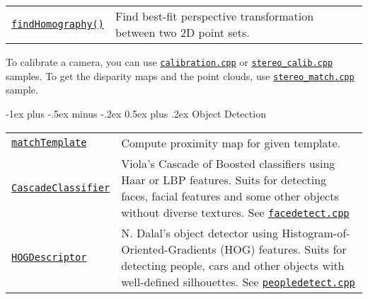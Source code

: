 \documentclass[10pt,landscape]{article}
\makeatletter
\renewcommand{\section}{\@startsection{section}{1}{0mm}%
                                {-1ex plus -.5ex minus -.2ex}%
                                {0.5ex plus .2ex}%
                                {\normalfont\large\bfseries}}
\makeatother
\begin{document}
\begin{multicols}{3}
\begin{tabular}{@{}p{\the\MyLen}%
                @{}p{\linewidth-\the\MyLen}@{}}
\texttt{\href{http://opencv.willowgarage.com/documentation/cpp/camera_calibration_and_3d_reconstruction.html\#cv-findhomography}{findHomography()}} & Find best-fit perspective transformation between two 2D point sets. \\

\end{tabular}

To calibrate a camera, you can use \texttt{\href{https://code.ros.org/svn/opencv/trunk/opencv/samples/c/calibration.cpp}{calibration.cpp}} or
\texttt{\href{https://code.ros.org/svn/opencv/trunk/opencv/samples/c/stereo\_calib.cpp}{stereo\_calib.cpp}} samples.
To get the disparity maps and the point clouds, use
\texttt{\href{https://code.ros.org/svn/opencv/trunk/opencv/samples/c/stereo\_match.cpp}{stereo\_match.cpp}} sample.

\section{Object Detection}

\begin{tabular}{@{}p{\the\MyLen}%
                @{}p{\linewidth-\the\MyLen}@{}}
                \texttt{\href{http://opencv.willowgarage.com/documentation/cpp/object_detection.html\#matchTemplate}{matchTemplate}} & Compute proximity map for given template.\\

\texttt{\href{http://opencv.willowgarage.com/documentation/cpp/object_detection.html\#CascadeClassifier}{CascadeClassifier}} & Viola's Cascade of Boosted classifiers using Haar or LBP features. Suits for detecting faces, facial features and some other objects without diverse textures. See \texttt{\href{https://code.ros.org/svn/opencv/trunk/opencv/samples/c/facedetect.cpp}{facedetect.cpp}}\\

\texttt{\href{http://opencv.willowgarage.com/documentation/cpp/object_detection.html\#HOGDescriptor}{HOGDescriptor}} & N. Dalal's object detector using Histogram-of-Oriented-Gradients (HOG) features. Suits for detecting people, cars and other objects with well-defined silhouettes. See \texttt{\href{https://code.ros.org/svn/opencv/trunk/opencv/samples/c/peopledetect.cpp}{peopledetect.cpp}}\\

\end{tabular}

%    
%    
%        

\end{multicols}
\end{document}
